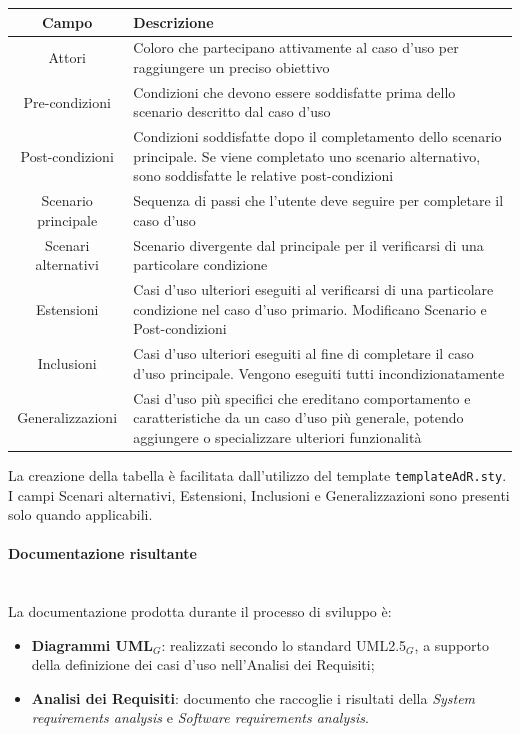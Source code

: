 \documentclass[10pt, letterpaper]{article}
\newcommand{\trisubsection}[1]{\paragraph{#1}\mbox{}\\}
\begin{document}
\begin{center}
    \begin{tabularx}{\textwidth}{|c| >{\centering\arraybackslash}X|}
        \hline
        \rowcolor{lightgray} \textbf{Campo} & \textbf{Descrizione} \\
        \hline
        Attori & Coloro che partecipano attivamente al caso d'uso per raggiungere un preciso obiettivo \\
        \hline
        Pre-condizioni & Condizioni che devono essere soddisfatte prima dello scenario descritto dal caso d'uso \\
        \hline
        Post-condizioni & Condizioni soddisfatte dopo il completamento dello scenario principale. Se viene completato uno scenario alternativo, sono soddisfatte le relative post-condizioni \\
        \hline
        Scenario principale & Sequenza di passi che l'utente deve seguire per completare il caso d'uso \\
        \hline
        Scenari alternativi & Scenario divergente dal principale per il verificarsi di una particolare condizione \\
        \hline
        Estensioni & Casi d'uso ulteriori eseguiti al verificarsi di una particolare condizione nel caso d'uso primario. Modificano Scenario e Post-condizioni \\
        \hline
        Inclusioni & Casi d'uso ulteriori eseguiti al fine di completare il caso d'uso principale. Vengono eseguiti tutti incondizionatamente \\
        \hline
        Generalizzazioni & Casi d'uso più specifici che ereditano comportamento e caratteristiche da un caso d'uso più generale, potendo aggiungere o specializzare ulteriori funzionalità \\
        \hline
    \end{tabularx}
\end{center}

La creazione della tabella è facilitata dall'utilizzo del template \texttt{templateAdR.sty}. I campi Scenari alternativi, Estensioni, Inclusioni e Generalizzazioni sono presenti solo quando applicabili.

\trisubsection{Documentazione risultante}
La documentazione prodotta durante il processo di sviluppo è:
\begin{itemize}
    \item \textbf{Diagrammi UML$_{G}$}: realizzati secondo lo standard UML2.5$_{G}$, a supporto della definizione dei casi d'uso nell'Analisi dei Requisiti;
    \item \textbf{Analisi dei Requisiti}: documento che raccoglie i risultati della \textit{System requirements analysis} e \textit{Software requirements analysis}.
\end{itemize}
\end{document}
